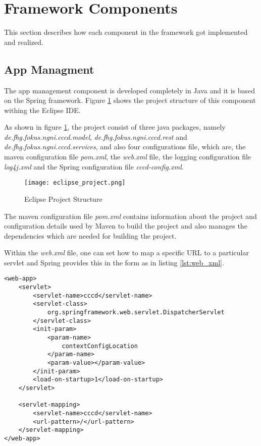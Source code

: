 \section{Framework Components\label{sec:impl_used_op_sr}}
This section describes how each component in the framework got implemented and realized.

\subsection{App Managment\label{sec:impl_app_man}}
The app management component is developed completely in Java and it is based on the Spring framework. Figure \ref{fig:eclipse_project} shows the project structure of this component withing the Eclipse IDE.

As shown in figure \ref{fig:eclipse_project}, the project consist of three java packages, namely \textit{de.fhg.fokus.ngni.cccd.model}, \textit{de.fhg.fokus.ngni.cccd.rest} and \textit{de.fhg.fokus.ngni.cccd.services}, and also four configurations file, which are, the maven configuration file \textit{pom.xml}, the \textit{web.xml} file, the logging configuration file \textit{log4j.xml} and the Spring configuration file \textit{cccd-config.xml}.

\begin{figure}[htb]
  \centering
  \texttt{[image: eclipse\_project.png]}\\
  \caption{Eclipse Project Structure}
  \label{fig:eclipse_project}
\end{figure}

\pagebreak

The maven configuration file \textit{pom.xml} contains information about the project and configuration details used by Maven to build the project and also manages the dependencies which are needed for building the project.

Within the \textit{web.xml} file, one can set how to map a specific \ac{URL} to a particular servlet and Spring provides this in the form as in listing \ref{lst:web_xml}.

\begin{code}
\begin{verbatim}
<web-app>
	<servlet>
		<servlet-name>cccd</servlet-name>
		<servlet-class>
			org.springframework.web.servlet.DispatcherServlet
		</servlet-class>
		<init-param>
			<param-name>
				contextConfigLocation
			</param-name>
			<param-value></param-value>
		</init-param>
		<load-on-startup>1</load-on-startup>
	</servlet>

	<servlet-mapping>
		<servlet-name>cccd</servlet-name>
		<url-pattern>/</url-pattern>
	</servlet-mapping>
</web-app>
\end{verbatim}
\caption{Excerpt from the web.xml configuration file}
\label{lst:web_xml}
\end{code}


